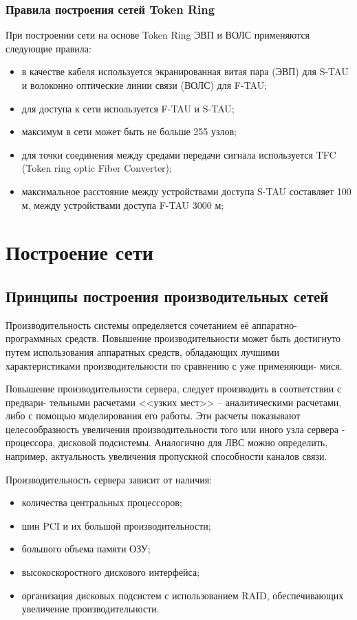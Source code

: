 \documentclass[russian,utf8,emptystyle]{eskdtext}
\begin{document}
\subsubsection{Правила построения сетей Token Ring}
При построении сети на основе Token Ring ЭВП и ВОЛС применяются следующие правила:
\begin{itemize}[label=-]
\item в качестве кабеля используется экранированная витая пара (ЭВП) для S-TAU и волоконно оптические линии связи (ВОЛС) для F-TAU;
\item для доступа к сети используется F-TAU и S-TAU;
\item максимум в сети может быть не больше 255 узлов;
\item для точки соединения между средами передачи сигнала используется TFC (Token ring optic Fiber Converter);
\item максимальное расстояние между устройствами доступа S-TAU составляет 100 м, между устройствами доступа F-TAU 3000 м;
\end{itemize}

\clearpage
\section{Построение сети}
\subsection{Принципы построения производительных сетей}

Производительность системы определяется сочетанием её аппаратно- программных средств.
Повышение производительности может быть достигнуто путем использования аппаратных средств,
обладающих лучшими характеристиками производительности по сравнению с уже применяющи-
мися.

Повышение производительности сервера, следует производить в соответствии с предвари-
тельными расчетами <<узких мест>> – аналитическими расчетами, либо с помощью моделирования
его работы. Эти расчеты показывают целесообразность увеличения производительности того или
иного узла сервера - процессора, дисковой подсистемы. Аналогично для ЛВС можно определить,
например, актуальность увеличения пропускной способности каналов связи.

Производительность сервера зависит от наличия:
\begin{itemize}[label=-]
\item количества центральных процессоров;
\item шин PCI и их большой производительности;
\item большого объема памяти ОЗУ;
\item высокоскоростного дискового интерфейса;
\item организация дисковых подсистем с использованием RAID, обеспечивающих увеличение производительности.
\end{itemize}
\end{document}
